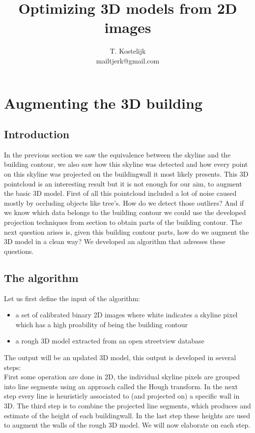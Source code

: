 \documentclass[10pt]{article}
\title{\sc Optimizing 3D models from 2D images}
\author{T. Kostelijk\\mailtjerk@gmail.com}
\begin{document}
\maketitle


\section{Augmenting the 3D building}
\subsection{Introduction}
In the previous section we saw the equivalence between the skyline and the building contour, we also saw how this skyline was detected and how every point on this skyline was projected on the buildingwall it most likely presents. 
This 3D pointcloud is an interesting result but it is not enough for our aim, to augment the basic 3D model.
First of all this pointcloud included a lot of noise caused mostly by occluding objects like tree's. How do we detect those outliers?
And if we know which data belongs to the building contour we could use the developed projection techniques from section %
to obtain parts of the building contour.
The next question arises is, given this building contour parts, how do we augment the 3D model in a clean way?
We developed an algorithm that adresses these questions.
\subsection{The algorithm}
Let us first define the input of the algorithm:
\begin{itemize}
	\item a set of calibrated binary 2D images where white indicates a skyline pixel which has a high proability of being the building contour
	\item a rough 3D model extracted from an open streetview database
\end{itemize}
The output will be an updated 3D model, this output is developed in several steps:\\
First some operation are done in 2D, the individual skyline pixels are grouped into line segments using an approach called the Hough transform. In the next step every line is heuristicly associated to (and projected on) a specific wall in 3D. The third step is to combine the projected line segments, which produces and estimate of the height of each buildingwall. In the last step these heights are used to augment the walls of the rough 3D model.
We will now elaborate on each step.
\end{document}
